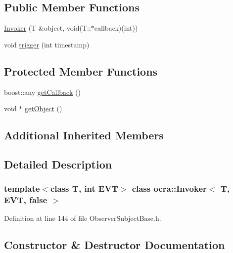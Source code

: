 \subsection*{Public Member Functions}
\begin{DoxyCompactItemize}
\item 
\hyperlink{classocra_1_1Invoker_3_01T_00_01EVT_00_01false_01_4_a913ba3411bdcdb4fa509673eb91de808}{Invoker} (T \&object, void(T\+::$\ast$callback)(int))
\item 
void \hyperlink{classocra_1_1Invoker_3_01T_00_01EVT_00_01false_01_4_a740261f9f9c3278c9668d192eae56c2a}{trigger} (int timestamp)
\end{DoxyCompactItemize}
\subsection*{Protected Member Functions}
\begin{DoxyCompactItemize}
\item 
boost\+::any \hyperlink{classocra_1_1Invoker_3_01T_00_01EVT_00_01false_01_4_a459bd95f3eae2d06b9167fd98c1c7e22}{get\+Callback} ()
\item 
void $\ast$ \hyperlink{classocra_1_1Invoker_3_01T_00_01EVT_00_01false_01_4_ad77a4342ddfd1b1e1387065276c54246}{get\+Object} ()
\end{DoxyCompactItemize}
\subsection*{Additional Inherited Members}


\subsection{Detailed Description}
\subsubsection*{template$<$class T, int E\+VT$>$\newline
class ocra\+::\+Invoker$<$ T, E\+V\+T, false $>$}



Definition at line 144 of file Observer\+Subject\+Base.\+h.



\subsection{Constructor \& Destructor Documentation}
\hypertarget{classocra_1_1Invoker_3_01T_00_01EVT_00_01false_01_4_a913ba3411bdcdb4fa509673eb91de808}{}\label{classocra_1_1Invoker_3_01T_00_01EVT_00_01false_01_4_a913ba3411bdcdb4fa509673eb91de808} 

